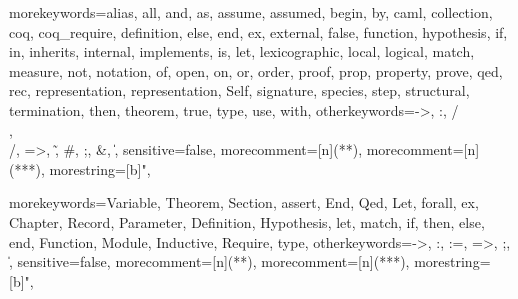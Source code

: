 \newcommand{\ocaml}{{\sf OCaml}}
\newcommand{\moca}{{\sf Moca}}
\newcommand{\focal}{{\sf FoCaL}}
\newcommand{\coq}{{\sf Coq}}
\newcommand{\cime}{{\sf CiME}}
\newcommand{\latex}{{\sf LaTeX}}
\newcommand{\zenon}{{\sf Zenon}}
\newcommand{\ocamldoc}{{\sf ocamldoc}}
\newcommand{\ocamlyacc}{{\sf ocamlyacc}}
\newcommand{\ocamllex}{{\sf ocamllex}}
\newcommand{\gcc}{{\sf gcc}}
\newcommand{\focdoc}{\textsc{focdoc}}
\newcommand{\focalize}{{\sf FoCaLize}}
\newcommand{\focalizedoc}{{\sf FoCaLizeDoc}}
\newcommand{\focalizec}{{\sf focalizec}}
\newcommand{\focalizedep}{{\sf focalizedep}}
\newcommand{\decldeps}[1] {\lbag\ #1\rbag}
\newcommand{\defdeps}[1]
  {\lbag\hspace{-0.2cm}\lbag\ #1\rbag\hspace{-0.2cm}\rbag}

  {morekeywords={alias, all, and, as, assume, assumed, begin, by, caml,
      collection, coq, coq_require, definition, else, end,
      ex, external, false, function, hypothesis, if, in,
      inherits, internal, implements, is, let, lexicographic,
      local, logical, match, measure, not, notation, of, open,
      on, or, order, proof, prop, property, prove, qed, rec,
      representation, representation, Self, signature, species, step,
      structural, termination, then, theorem, true, type, use,
      with},
    otherkeywords={->, :, /\\, \\/, =>, \~, \#, ;, \&, \|},
    sensitive=false,
    morecomment=[n]{(*}{*)},  %
    morecomment=[n]{(**}{*)},  %
    morestring=[b]",
  }

\newcommand{\setlangfocalize}{
\lstset{
  language=Focal, tabsize=2, frame=single, breaklines=true,
  basicstyle=\ttfamily, framexleftmargin=1mm, xleftmargin=1mm
}
}
\setlangfocalize


  {morekeywords={Variable, Theorem, Section, assert, End, Qed, Let,
      forall, ex, Chapter, Record, Parameter, Definition, Hypothesis,
      let, match, if, then, else, end, Function, Module, Inductive,
      Require, type},
    otherkeywords={->, :, :=, =>, ;, \|},
    sensitive=false,
    morecomment=[n]{(*}{*)},   %
    morecomment=[n]{(**}{*)},  %
    morestring=[b]",
  }

